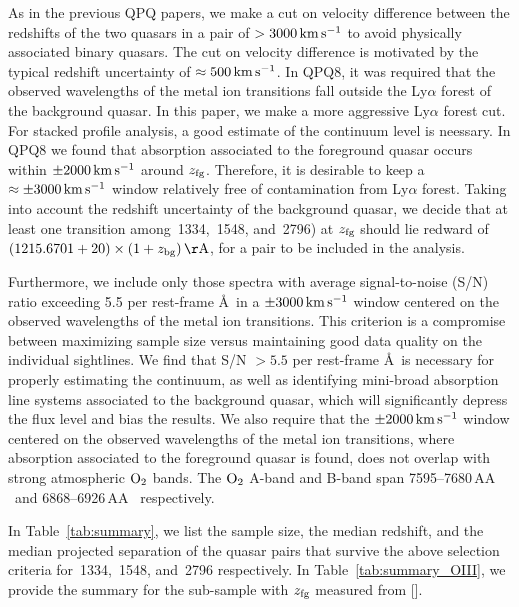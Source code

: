 \documentclass[iop]{emulateapj}
\begin{document}
As in the previous QPQ papers, we make a cut on velocity difference between the redshifts of the 
two quasars in a pair of $>3000\,{\rm km\,s^{-1}}$ to avoid physically associated binary quasars. 
The cut on velocity difference is motivated by the typical redshift uncertainty of 
$\approx500\,{\rm km\,s^{-1}}$. In QPQ8, it was required that the observed wavelengths of the 
metal ion transitions fall outside the Ly$\alpha$ forest of the background quasar. In this paper, 
we make a more aggressive Ly$\alpha$ forest cut. For stacked profile analysis, a good estimate of 
the continuum level is neessary. In QPQ8 we found that absorption associated to 
the foreground quasar occurs within $\pm2000\,{\rm km\,s^{-1}}$ around $z_{\rm fg}$. Therefore, it 
is desirable to keep a $\approx\pm3000\,{\rm km\,s^{-1}}$ window relatively free of contamination 
from Ly$\alpha$ forest. Taking into account the redshift uncertainty of the background quasar, 
we decide that at least one transition among \,1334, \,1548, and 
\,2796) at $z_{\rm fg}$ should lie redward of 
$(1215.6701+20)\times(1+z_{\rm bg})\,{\rm \AA}$, for a pair to be included in the analysis. 

Furthermore, we include only those spectra with average signal-to-noise (S/N) ratio exceeding 5.5 
per rest-frame \AA \ in a $\pm3000\,{\rm km\,s^{-1}}$ window centered on the observed wavelengths 
of the metal ion transitions. This criterion is a compromise between maximizing sample size versus 
maintaining good data quality on the individual sightlines. We find that S/N $>5.5$ per rest-frame 
\AA \ is 
necessary for properly estimating the continuum, as well as identifying mini-broad absorption line 
systems associated to the background quasar, which will significantly depress the flux level and 
bias the results. We also require that the $\pm2000\,{\rm km\,s^{-1}}$ window centered on the 
observed wavelengths of the metal ion transitions, where absorption associated to the foreground 
quasar is found, does not overlap with strong atmospheric ${\rm O}_2$ bands. The ${\rm O}_2$ 
A-band and B-band span 7595\textrm{--}7680\,AA \ and 6868\textrm{--}6926\,AA \ respectively. 

In Table~\ref{tab:summary}, we list the sample size, the median redshift, and the median projected 
separation of the quasar pairs that survive the above selection criteria for \,1334, 
\,1548, and \,2796 respectively. In Table~\ref{tab:summary_OIII}, we provide 
the summary for the sub-sample with $z_{\rm fg}$ measured from []. 
\end{document}
